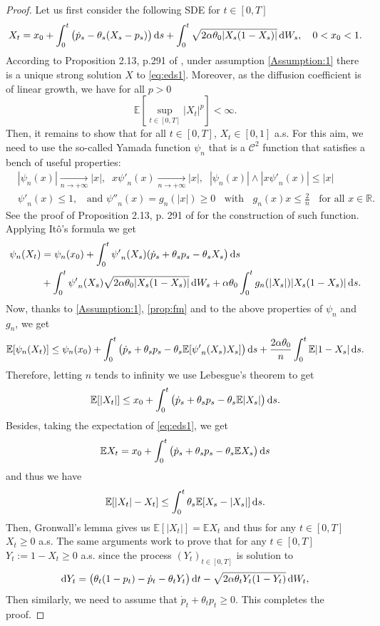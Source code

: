 \documentclass[11pt]{article}
\theoremstyle{definition}
\begin{document}
\begin{proof}
Let us first consider the following SDE for $t\in[0,T]$
\begin{equation}\label{eq:eds1}
X_t=x_0+  \int_0^t\big(\dot p_s - \theta_s(X_s-p_s)  \big)\dif s  + \int_0^t\sqrt{2\alpha \theta_0 |X_s(1-X_s)|} \dif W_s, \quad 0<x_0<1.
\end{equation}
According to Proposition 2.13, p.291 of \cite{KarShr}, under assumption  \eqref{Assumption:1} there is a unique strong solution $X$ to \eqref{eq:eds1}. Moreover, as the diffusion coefficient is of linear growth, we have  for all $p>0$ 
\begin{equation}\label{prop:fm}
\mathbb E[ \sup_{t\in[0,T]}|X_t|^p]<\infty.
\end{equation}
Then, it remains to show that for all $t\in[0,T]$, $X_t\in[0,1]$ a.s. For this aim, we need to use the so-called Yamada function $\psi_n$ that is a $\mathcal C^2$ function that satisfies a bench of useful properties:
\begin{align*}
&|\psi_n(x)|\underset{n\rightarrow+\infty}{\rightarrow}|x|, \;\; x{\psi'}_n(x)\underset{n\rightarrow+\infty}{\rightarrow}|x|, \;\; |\psi_n(x)|\wedge |x{\psi'}_n(x)| \le |x|\\
&{\psi'}_n(x)\le 1, \;\; \mbox{ and } {\psi''}_n(x)=g_n(|x|)\ge 0\;\; \mbox{ with } \;\; g_n(x)x\le \frac 2n\;\;  \mbox{ for all } x\in \mathbb R .
\end{align*}
See the proof of Proposition 2.13, p. 291 of \cite{KarShr} for the construction of such function.
Applying Itô's formula we get
\begin{align*}
\psi_n(X_t)&=\psi_n(x_0) +\int_0^t {\psi'}_n(X_s)(\dot p_s + \theta_s p_s - \theta_sX_s  \big)\dif s \\
&+ \int_0^t{\psi'}_n(X_s)\sqrt{2\alpha \theta_0 |X_s(1-X_s)|} \dif W_s + \alpha \theta_0 \int_0^t  g_n(|X_s|) |X_s(1-X_s)|\dif s.
\end{align*}
Now, thanks to  \eqref{Assumption:1}, \eqref{prop:fm} and to the above properties of $\psi_n$ and $g_n$, we get
$$
\mathbb E[\psi_n(X_t)]\le \psi_n(x_0) +\int_0^t \big(\dot p_s + \theta_sp_s -  \theta_s \mathbb E[{\psi'}_n(X_s)X_s] \big)\dif s + \frac{2\alpha  \theta_0}{n}\int_0^t \mathbb E |1-X_s|\dif s.
$$
Therefore, letting $n$ tends to infinity we use Lebesgue's theorem to get
$$
\mathbb E[|X_t|]\le x_0 +\int_0^t \big(\dot p_s + \theta_sp_s -  \theta_s \mathbb E|X_s| \big)\dif s.
$$
Besides, taking the expectation of \eqref{eq:eds1}, we get
$$
\mathbb E X_t=x_0+  \int_0^t\big(\dot p_s +\theta_sp_s - \theta_s \mathbb EX_s  \big)\dif s
$$
and thus we have 
$$
\mathbb E[|X_t| -X_t ]\le \int_0^t \theta_s \mathbb E[ X_s - |X_s| ]\dif s.
$$
Then, Gronwall's lemma gives us $\mathbb E[|X_t|]=\mathbb E X_t$ and thus for any $t\in[0,T]$ $X_t\ge0$ a.s. The same arguments work to prove that  for any $t\in[0,T]$ $Y_t:=1-X_t\ge0$  a.s.  since the process $(Y_t)_{t\in[0,T]}$ is solution to 
$$
\dif Y_t= \big( \theta_t(1-p_t) -\dot p_t - \theta_tY_t  \big)\dif t  -\sqrt{2\alpha \theta_tY_t(1-Y_t)} \dif W_t,
$$
Then similarly, we need to assume that $\dot p_t +\theta_tp_t\ge 0$. This completes the proof.
\end{proof}
\end{document}
